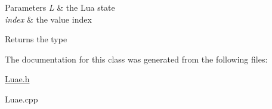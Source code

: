 \begin{DoxyParams}{Parameters}
{\em L} & the Lua state \\
\hline
{\em index} & the value index \\
\hline
\end{DoxyParams}
\begin{DoxyReturn}{Returns}
the type 
\end{DoxyReturn}


The documentation for this class was generated from the following files\-:\begin{DoxyCompactItemize}
\item 
\hyperlink{a00089}{Luae.\-h}\item 
Luae.\-cpp\end{DoxyCompactItemize}
